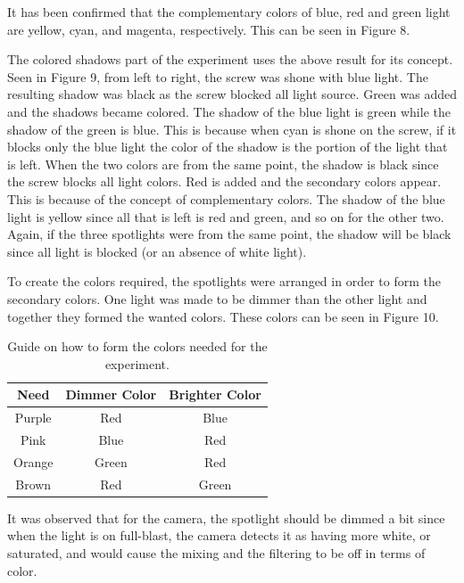 \documentclass[twoside]{article}
\begin{document}
It has been confirmed that the complementary colors of blue, red and green light are yellow, cyan, and magenta, respectively. This can be seen in Figure 8.

The colored shadows part of the experiment uses the above result for its concept. Seen in Figure 9, from left to right, the screw was shone with blue light. The resulting shadow was black as the screw blocked all light source. Green was added and the shadows became colored. The shadow of the blue light is green while the shadow of the green is blue. This is because when cyan is shone on the screw, if it blocks only the blue light the color of the shadow is the portion of the light that is left. When the two colors are from the same point, the shadow is black since the screw blocks all light colors. Red is added and the secondary colors appear. This is because of the concept of complementary colors. The shadow of the blue light is yellow since all that is left is red and green, and so on for the other two. Again, if the three spotlights were from the same point, the shadow will be black since all light is blocked (or an absence of white light).

To create the colors required, the spotlights were arranged in order to form the secondary colors. One light was made to be dimmer than the other light and together they formed the wanted colors. These colors can be seen in Figure 10.

\captionsetup[table]{width=4in}
\begin{table}[h!]
\centering
\caption{Guide on how to form the colors needed for the experiment.}
\begin{tabular}{||c|c|c||}
\hline
Need & Dimmer Color & Brighter Color \\ \hline \hline
Purple & Red & Blue \\ \hline
Pink & Blue & Red \\ \hline
Orange & Green & Red \\ \hline
Brown & Red & Green \\ \hline
\end{tabular}
\label{tab:mytab}
\end{table}

It was observed that for the camera, the spotlight should be dimmed a bit since when the light is on full-blast, the camera detects it as having more white, or saturated, and would cause the mixing and the filtering to be off in terms of color.

\end{document}
